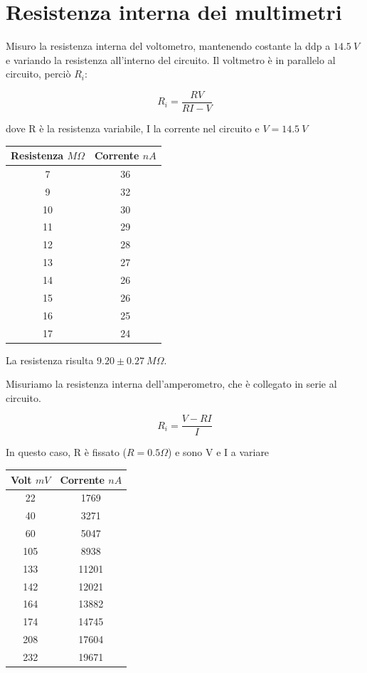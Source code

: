 \section{Resistenza interna dei multimetri}
Misuro la resistenza interna del voltometro, mantenendo costante la ddp a $14.5\ V$ e variando la resistenza all'interno del circuito. 
Il voltmetro è in parallelo al circuito, perciò $R_i$:

$$R_i = \frac{RV}{RI-V} $$

dove R è la resistenza variabile, I la corrente nel circuito e $V= 14.5\ V$

\begin{center}
\begin{tabular}{*{2}{c}}
Resistenza $M\Omega$ & Corrente $nA$\\
\midrule
7&      36\\
9&      32\\
10& 30\\
11&     29\\
12&     28\\
13&     27\\
14&     26\\
15&     26\\
16&     25\\
17&     24\\

\end{tabular}

\end{center}
La resistenza risulta $9.20 \pm 0.27 \ M \Omega$.


Misuriamo la resistenza interna dell'amperometro, che è collegato in serie al circuito. 

$$R_i = \frac{V-RI}{I}$$

In questo caso, R è fissato ($R=0.5 \Omega$) e sono V e I a variare
\begin{center}
\begin{tabular}{*{2}{c}}
Volt $mV$ & Corrente $nA$\\
\midrule
22&      1769\\
40&      3271\\
60&      5047\\
105&     8938\\
133&     11201\\
142&     12021\\
164&     13882\\
174&     14745\\
208&     17604\\
232&     19671\\



\end{tabular}
\end{center}

